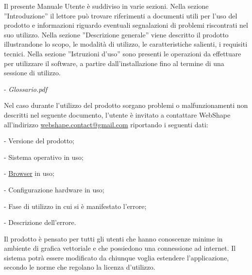  
\newpage
\thispagestyle{fancy}
\tableofcontents
\thispagestyle{fancy}
\newpage
 
 
Il presente Manuale Utente \`e suddiviso in varie sezioni. Nella sezione ''Introduzione'' il lettore pu\`o trovare riferimenti a documenti utili per l'uso del prodotto e informazioni riguardo eventuali segnalazioni di problemi riscontrati nel suo utilizzo.
Nella sezione ''Descrizione generale'' viene descritto il prodotto illustrandone lo scopo, le modalit\`a di utilizzo, le caratteristiche salienti, i requisiti tecnici. Nella sezione ''Istruzioni d'uso'' sono presenti le operazioni da effettuare per utilizzare il software, a partire dall'installazione fino al termine di una sessione di utilizzo.\\ %
 
 
\begin{elencopuntato}[\normindent]
  \item[-] \textit{Glossario.pdf}
\end{elencopuntato}
 
Nel caso durante l'utilizzo del prodotto sorgano problemi o malfunzionamenti non descritti nel seguente documento, l'utente \`e invitato a contattare WebShape all'indirizzo \href{mailto:webshape.contact@gmail.com}{webshape.contact@gmail.com} riportando i seguenti dati:\\
\begin{elencopuntato}[\normindent]
  \item[-] Versione del prodotto;
  \item[-] Sistema operativo in uso;
  \item[-] \underline{Browser} in uso;
  \item[-] Configurazione hardware in uso;
  \item[-] Fase di utilizzo in cui si \`e manifestato l'errore;
  \item[-] Descrizione dell'errore.
\end{elencopuntato}
 

Il prodotto \`e pensato per tutti gli utenti che hanno conoscenze minime in ambiente di grafica vettoriale e che possiedono una connessione ad internet. Il sistema potr\`a essere modificato da chiunque voglia estendere l'applicazione, secondo le norme che regolano la licenza d'utilizzo.\\
 
